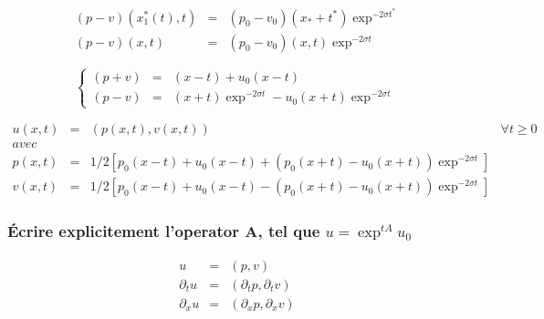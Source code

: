 \documentclass[a4paper,11pt]{article}
\begin{document}
\begin{equation*}
\begin{array}{rcl}
    (p-v)(x_{1}^{*}(t), t) &=& (p_{0}-v_{0})(x_{*} + t^{*})\exp^{-2\sigma t^{*}} \\
    (p-v)(x,t) &=& (p_{0}-v_{0})(x,t)\exp^{-2\sigma t}
\end{array}
\end{equation*}

\begin{equation*}
\left\{
\begin{array}{rcl}
    (p+v) &=& (x - t) + u_{0}(x - t) \\
    (p-v) &=& (x + t) \exp^{-2\sigma t} - u_{0}(x + t) \exp^{-2\sigma t}
\end{array}
\right.
\end{equation*}

\begin{equation*}
\begin{array}{rcll}
    u(x,t) &=& (p(x,t), v(x,t)) & \forall t \ge 0 \\
    avec & & & \\
    p(x,t) &=& 1/2\left[p_{0}(x - t) + u_{0}(x - t) + (p_{0}(x + t) - u_{0}(x + t))\exp^{-2\sigma t} \right] & \\
    v(x,t) &=& 1/2\left[p_{0}(x - t) + u_{0}(x - t) - (p_{0}(x + t) - u_{0}(x + t))\exp^{-2\sigma t} \right] &
\end{array}
\end{equation*}


\subsubsection*{Écrire explicitement l'operator A, tel que \( u = \exp^{tA}u_{0} \)}

\begin{equation*}
\begin{array}{rcl}
    u &=& (p, v) \\
    \partial_{t}u &=& (\partial_{t}p,  \partial_{t}v) \\
    \partial_{x}u &=& (\partial_{x}p,  \partial_{x}v)
\end{array}
\end{equation*}
\end{document}
